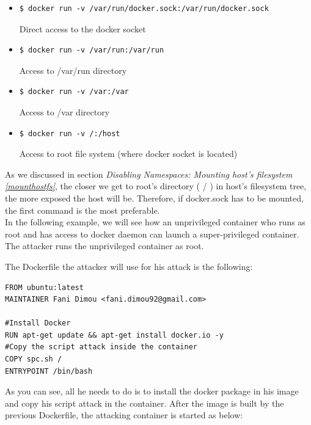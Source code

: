 \begin{itemize}
\item \begin{lstlisting}[style=dockercommands]
$ docker run -v /var/run/docker.sock:/var/run/docker.sock
\end{lstlisting}
Direct access to the docker socket

\item \begin{lstlisting}[style=dockercommands]
$ docker run -v /var/run:/var/run
\end{lstlisting}
Access to /var/run directory

\item \begin{lstlisting}[style=dockercommands]
$ docker run -v /var:/var
\end{lstlisting}
Access to /var directory

\item \begin{lstlisting}[style=dockercommands]
$ docker run -v /:/host
\end{lstlisting}
Access to root file system (where docker socket is located)
\end{itemize}

As we discussed in section \textit{Disabling Namespaces: Mounting host's filesystem \ref{mounthostfs}}, the closer we get to root's directory ( / ) in host's filesystem tree, the more exposed the host will be. Therefore, if docker.sock has to be mounted, the first command is the most preferable.
\\
 
In the following example, we will see how an unprivileged container who runs as root and has access to docker daemon can launch a super-privileged container.
The attacker runs the unprivileged container as root. \cite{hosttakeover}

The Dockerfile the attacker will use for his attack is the following:

\begin{lstlisting}[style=Dockerfile, caption={Dockerfile used for spc\_example image}]
FROM ubuntu:latest
MAINTAINER Fani Dimou <fani.dimou92@gmail.com>

#Install Docker
RUN apt-get update && apt-get install docker.io -y
#Copy the script attack inside the container
COPY spc.sh /
ENTRYPOINT /bin/bash
\end{lstlisting}

As you can see, all he needs to do is to install the docker package in his image and copy his script attack in the container. After the image is built by the previous Dockerfile, the attacking container is started as below:

